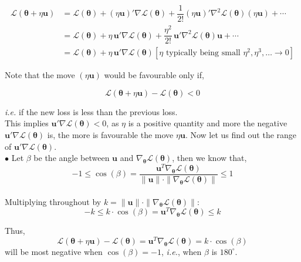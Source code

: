 \documentclass[11pt, a4paper]{article}
\begin{document}
\begin{align*}
\mathscr{L}(\boldsymbol{\theta} + \eta \boldsymbol{u}) &= \mathscr{L}(\boldsymbol{\theta}) + (\eta \boldsymbol{u})' \nabla \mathscr{L}(\boldsymbol{\theta}) + \dfrac{1}{2!} (\eta \boldsymbol{u})' \nabla^2 \mathscr{L}(\boldsymbol{\theta}) (\eta \boldsymbol{u}) + \cdots \\[0.5em]
&= \mathscr{L}(\boldsymbol{\theta}) + \eta \, \boldsymbol{u}' \nabla \mathscr{L}(\boldsymbol{\theta}) + \dfrac{\eta^2}{2!} \, \boldsymbol{u}' \nabla^2 \mathscr{L}(\boldsymbol{\theta}) \boldsymbol{u} + \cdots \\[0.5em]
&= \mathscr{L}(\boldsymbol{\theta}) + \eta \, \boldsymbol{u}' \nabla \mathscr{L}(\boldsymbol{\theta}) \left[ \eta \text{ typically being small } \eta^2, \eta^3, \ldots \rightarrow 0 \right]
\end{align*} 

Note that the move $\left( \eta \boldsymbol{u} \right)$ would be favourable only if,

$$\mathscr{L}(\boldsymbol{\theta} + \eta \boldsymbol{u}) - \mathscr{L}(\boldsymbol{\theta}) < 0$$

\textit{i.e.} if the new loss is less than the previous loss. \\

This implies $\boldsymbol{u}' \nabla \mathscr{L}(\boldsymbol{\theta}) < 0$, as $\eta$ is a positive quantity and more the negative $\boldsymbol{u}' \nabla \mathscr{L}(\boldsymbol{\theta})$ is, the more is favourable the move $\eta \boldsymbol{u}$. Now let us find out the range of $\boldsymbol{u}' \nabla \mathscr{L}(\boldsymbol{\theta})$. \\[0.5em]

$\bullet$ Let $\beta$ be the angle between $\boldsymbol{u}$ and $\nabla_{\boldsymbol{\theta}} \mathscr{L}(\boldsymbol{\theta})$, then we know that,
\[
-1 \leq \cos(\beta) = \dfrac{\boldsymbol{u}^T \nabla_{\boldsymbol{\theta}} \mathscr{L}(\boldsymbol{\theta})}{\|\boldsymbol{u}\| \cdot \|\nabla_{\boldsymbol{\theta}} \mathscr{L}(\boldsymbol{\theta})\|} \leq 1
\] \\[0.5em]

Multiplying throughout by $k = \|\boldsymbol{u}\| \cdot \|\nabla_{\boldsymbol{\theta}} \mathscr{L}(\boldsymbol{\theta})\|$:
\[
-k \leq k \cdot \cos(\beta) = \boldsymbol{u}^T \nabla_{\boldsymbol{\theta}} \mathscr{L}(\boldsymbol{\theta}) \leq k
\]

Thus,
\[
\mathscr{L}(\boldsymbol{\theta} + \eta \boldsymbol{u}) - \mathscr{L}(\boldsymbol{\theta}) = \boldsymbol{u}^T \nabla_{\boldsymbol{\theta}} \mathscr{L}(\boldsymbol{\theta}) = k \cdot \cos(\beta)
\]
will be most negative when $\cos(\beta) = -1$, \textit{i.e.}, when $\beta$ is $180^\circ$. \\[0.25em]
\end{document}
